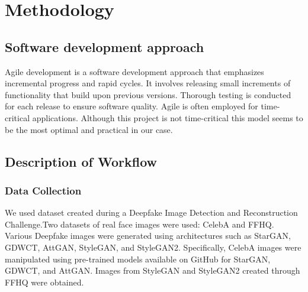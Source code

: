     \chapter{Methodology}
       \section{Software development approach}
        Agile development is a software development approach that emphasizes incremental progress and rapid cycles. It involves releasing small increments of functionality that build upon previous versions. Thorough testing is conducted for each release to ensure software quality. Agile is often employed for time-critical applications. Although this project is not time-critical this model seems to be the most optimal and practical in our case.
        \begin{figure}[hbt!]
        \end{figure}
        \newpage
        \section{Description of Workflow}
        \subsection{Data Collection}
        We used dataset created during a Deepfake Image Detection and Reconstruction Challenge.Two datasets of real face images were used: CelebA and FFHQ. Various Deepfake images were generated using architectures such as StarGAN, GDWCT, AttGAN, StyleGAN, and StyleGAN2. Specifically, CelebA images were manipulated using pre-trained models available on GitHub for StarGAN, GDWCT, and AttGAN. Images from StyleGAN and StyleGAN2 created through FFHQ were obtained.
        
